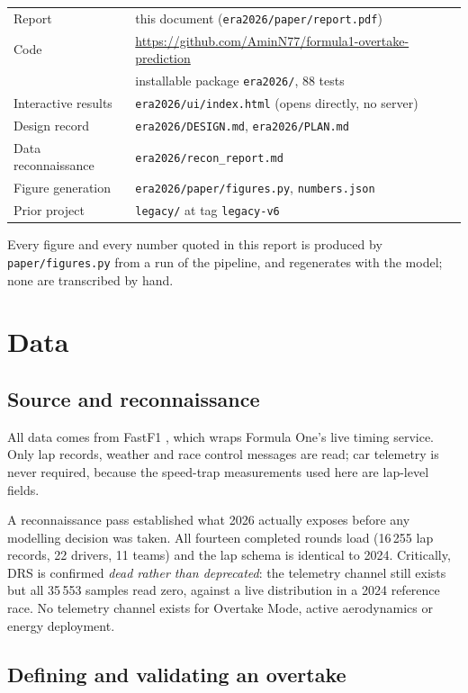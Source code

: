 \documentclass[11pt,a4paper]{article}
\begin{document}
\begin{tabular}{@{}ll@{}}
\toprule
Report & this document (\texttt{era2026/paper/report.pdf}) \\
Code & \url{https://github.com/AminN77/formula1-overtake-prediction} \\
 & installable package \texttt{era2026/}, 88 tests \\
Interactive results & \texttt{era2026/ui/index.html} (opens directly, no server) \\
Design record & \texttt{era2026/DESIGN.md}, \texttt{era2026/PLAN.md} \\
Data reconnaissance & \texttt{era2026/recon\_report.md} \\
Figure generation & \texttt{era2026/paper/figures.py}, \texttt{numbers.json} \\
Prior project & \texttt{legacy/} at tag \texttt{legacy-v6} \\
\bottomrule
\end{tabular}

\medskip
\noindent
Every figure and every number quoted in this report is produced by
\texttt{paper/figures.py} from a run of the pipeline, and regenerates with the
model; none are transcribed by hand.

\section{Data}

\subsection{Source and reconnaissance}

All data comes from FastF1 \citep{fastf1}, which wraps Formula One's live
timing service. Only lap records, weather and race control messages are read;
car telemetry is never required, because the speed-trap measurements used here
are lap-level fields.

A reconnaissance pass established what 2026 actually exposes before any
modelling decision was taken. All fourteen completed rounds load
(16\,255 lap records, 22 drivers, 11 teams) and the lap schema is
identical to 2024. Critically, DRS is confirmed \emph{dead rather than
deprecated}: the telemetry channel still exists but all 35\,553 samples read
zero, against a live distribution in a 2024 reference race. No telemetry channel
exists for Overtake Mode, active aerodynamics or energy deployment.

\subsection{Defining and validating an overtake}
\end{document}
